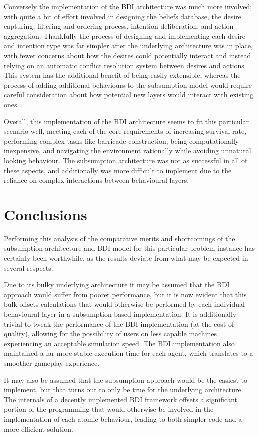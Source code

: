 \documentclass[a4paper,12pt]{article}
\begin{document}
Conversely the implementation of the BDI architecture was much more involved; with quite a bit of effort involved in designing the beliefs database, the desire capturing, filtering and ordering process, intention deliberation, and action aggregation. Thankfully the process of designing and implementing each desire and intention type was far simpler after the underlying architecture was in place, with fewer concerns about how the desires could potentially interact and instead relying on an automatic conflict resolution system between desires and actions. This system has the additional benefit of being easily extensible, whereas the process of adding additional behaviours to the subsumption model would require careful consideration about how potential new layers would interact with existing ones.

Overall, this implementation of the BDI architecture seems to fit this particular scenario well, meeting each of the core requirements of increasing survival rate, performing complex tasks like barricade construction, being computationally inexpensive, and navigating the environment rationally while avoiding unnatural looking behaviour. The subsumption architecture was not as successful in all of these aspects, and additionally was more difficult to implement due to the reliance on complex interactions between behavioural layers.

\section{Conclusions}
\noindent
Performing this analysis of the comparative merits and shortcomings of the subsumption architecture and BDI model for this particular problem instance has certainly been worthwhile, as the results deviate from what may be expected in several respects.

Due to its bulky underlying architecture it may be assumed that the BDI approach would suffer from poorer performance, but it is now evident that this bulk offsets calculations that would otherwise be performed by each individual behavioural layer in a subsumption-based implementation. It is additionally trivial to tweak the performance of the BDI implementation (at the cost of quality), allowing for the possibility of users on less capable machines experiencing an acceptable simulation speed. The BDI implementation also maintained a far more stable execution time for each agent, which translates to a smoother gameplay experience.

It may also be assumed that the subsumption approach would be the easiest to implement, but that turns out to only be true for the underlying architecture. The internals of a decently implemented BDI framework offsets a significant portion of the programming that would otherwise be involved in the implementation of each atomic behaviour, leading to both simpler code and a more efficient solution.
\end{document}
